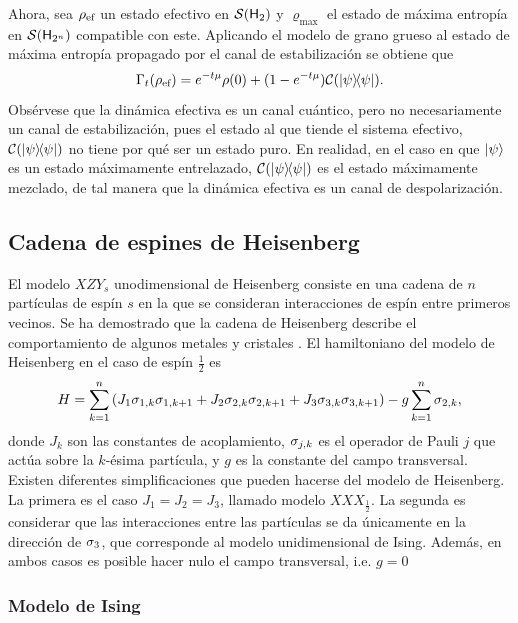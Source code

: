 Ahora, sea $\rho_{\text{ef}}$ un estado efectivo en $\mathcal{S}({\sf H}_{2})$ y $\varrho_{\max}$ el estado de máxima entropía en $\mathcal{S}({\sf H}_{2^{n}})$ compatible con este. Aplicando el modelo de grano grueso al estado de máxima entropía propagado por el canal de estabilización se obtiene que
\begin{equation}
    \Gamma_{t}(\rho_{\ef})=e^{-t\mu}\rho(0)+(1-e^{-t \mu})\mcC(\dyad{\psi}).\nonumber
\end{equation}
Obsérvese que la dinámica efectiva es un canal cuántico, pero no necesariamente un canal de estabilización, pues el estado al que tiende el sistema efectivo, $\mcC(\dyad{\psi})$ no tiene por qué ser un estado puro. En realidad, en el caso en que $\ket{\psi}$ es un estado máximamente entrelazado, $\mcC(\dyad{\psi})$ es el estado máximamente mezclado, de tal manera que la dinámica efectiva es un canal de despolarización.

\subsection{Cadena de espines de Heisenberg}

El modelo $XZY_{s}$ unodimensional de Heisenberg consiste en una cadena de $n$ partículas de espín $s$ en la que se consideran interacciones de espín entre primeros vecinos. Se ha demostrado que la cadena de Heisenberg describe el comportamiento de algunos metales y cristales . El hamiltoniano del modelo de Heisenberg en el caso de espín $\frac{1}{2}$ es
\begin{equation}
    H=\sum_{k=1}^{n}\qty(J_{1}\sigma_{1,k}\sigma_{1,k+1}+J_{2}\sigma_{2,k}\sigma_{2,k+1}+J_{3}\sigma_{3,k}\sigma_{3,k+1})-g\sum_{k=1}^{n}\sigma_{2,k},
\end{equation}
donde $J_{k}$ son las constantes de acoplamiento, $\sigma_{j,k}$ es el operador de Pauli $j$ que actúa sobre la $k$-ésima partícula, y $g$ es la constante del campo transversal. Existen diferentes simplificaciones que pueden hacerse del modelo de Heisenberg. La primera es el caso $J_{1}=J_{2}=J_{3}$, llamado modelo $XXX_{\frac{1}{2}}$. La segunda es considerar que las interacciones entre las partículas se da únicamente en la dirección de $\sigma_{3}$, que corresponde al modelo unidimensional de Ising. Además, en ambos casos es posible hacer nulo el campo transversal, i.e. $g=0$

\subsubsection{Modelo de Ising}

